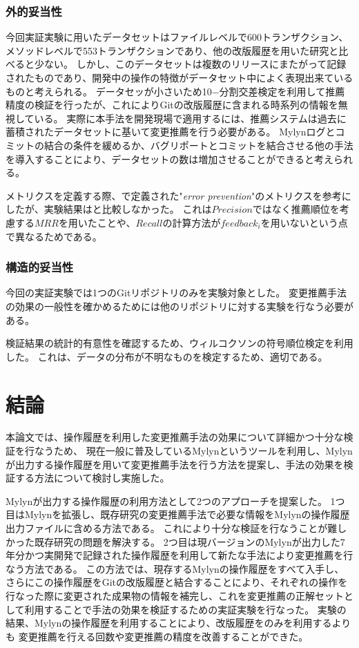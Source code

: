 \documentclass[a4paper]{jsbook}
\begin{document}
\subsection{外的妥当性}
今回実証実験に用いたデータセットはファイルレベルで600トランザクション、メソッドレベルで553トランザクションであり、他の改版履歴を用いた研究と比べると少ない。
しかし、このデータセットは複数のリリースにまたがって記録されたものであり、開発中の操作の特徴がデータセット中によく表現出来ているものと考えられる。
データセッが小さいため10−分割交差検定を利用して推薦精度の検証を行ったが、これによりGitの改版履歴に含まれる時系列の情報を無視している。
実際に本手法を開発現場で適用するには、推薦システムは過去に蓄積されたデータセットに基いて変更推薦を行う必要がある。
Mylynログとコミットの結合の条件を緩めるか、バグリポートとコミットを結合させる他の手法を導入することにより、データセットの数は増加させることができると考えられる。

メトリクスを定義する際、\cite{Zimmermann:2005}で定義された"{\it error prevention}"のメトリクスを参考にしたが、実験結果は\cite{Zimmermann:2005}と比較しなかった。
これは$Precision$ではなく推薦順位を考慮する$MRR$を用いたことや、$Recall$の計算方法が$feedback_i$を用いないという点で異なるためである。


\subsection{構造的妥当性}
今回の実証実験では1つのGitリポジトリのみを実験対象とした。
変更推薦手法の効果の一般性を確かめるためには他のリポジトリに対する実験を行なう必要がある。

検証結果の統計的有意性を確認するため、ウィルコクソンの符号順位検定を利用した。
これは、データの分布が不明なものを検定するため、適切である。
\chapter{結論}\label{conclusion_chap}
本論文では、操作履歴を利用した変更推薦手法の効果について詳細かつ十分な検証を行なうため、
現在一般に普及しているMylynというツールを利用し、Mylynが出力する操作履歴を用いて変更推薦手法を行う方法を提案し、手法の効果を検証する方法について検討し実施した。

Mylynが出力する操作履歴の利用方法として2つのアプローチを提案した。
1つ目はMylynを拡張し、既存研究の変更推薦手法で必要な情報をMylynの操作履歴出力ファイルに含める方法である。
これにより十分な検証を行なうことが難しかった既存研究の問題を解決する。
2つ目は現バージョンのMylynが出力した7年分かつ実開発で記録された操作履歴を利用して新たな手法により変更推薦を行なう方法である。
この方法では、現存するMylynの操作履歴をすべて入手し、さらにこの操作履歴をGitの改版履歴と結合することにより、それぞれの操作を行なった際に変更された成果物の情報を補完し、これを変更推薦の正解セットとして利用することで手法の効果を検証するための実証実験を行なった。
実験の結果、Mylynの操作履歴を利用することにより、改版履歴をのみを利用するよりも
変更推薦を行える回数や変更推薦の精度を改善することができた。
\end{document}
